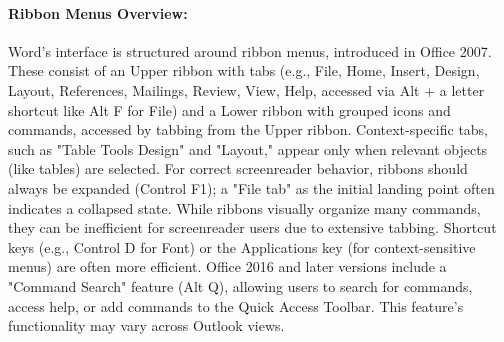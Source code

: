 \paragraph{Ribbon Menus Overview:}
Word's interface is structured around ribbon menus, introduced in Office 2007. These consist of an Upper ribbon with tabs (e.g., File, Home, Insert, Design, Layout, References, Mailings, Review, View, Help, accessed via Alt + a letter shortcut like Alt F for File) and a Lower ribbon with grouped icons and commands, accessed by tabbing from the Upper ribbon.\supercite{kingsbury2025} Context-specific tabs, such as "Table Tools Design" and "Layout," appear only when relevant objects (like tables) are selected.\supercite{kingsbury2025} For correct screenreader behavior, ribbons should always be expanded (Control F1); a "File tab" as the initial landing point often indicates a collapsed state.\supercite{kingsbury2025} While ribbons visually organize many commands, they can be inefficient for screenreader users due to extensive tabbing. Shortcut keys (e.g., Control D for Font) or the Applications key (for context-sensitive menus) are often more efficient.\supercite{kingsbury2025} Office 2016 and later versions include a "Command Search" feature (Alt Q), allowing users to search for commands, access help, or add commands to the Quick Access Toolbar. This feature's functionality may vary across Outlook views.\supercite{kingsbury2025}
